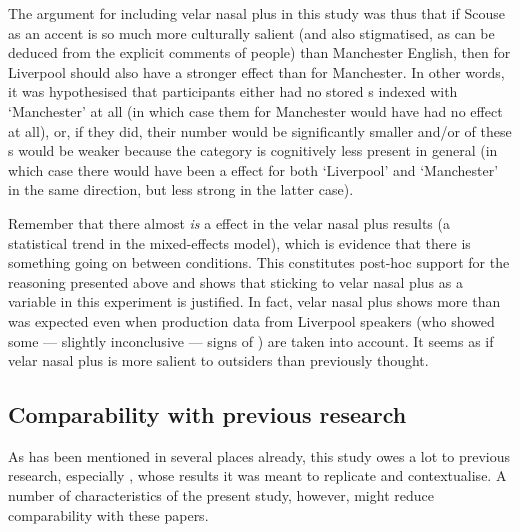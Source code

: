 The argument for including velar nasal plus in this study was thus that if Scouse as an accent is so much more culturally salient (and also stigmatised, as can be deduced from the explicit comments of people) than Manchester English, then  for Liverpool should also have a stronger effect than  for Manchester.
In other words, it was hypothesised that participants either had no stored s indexed with `Manchester' at all (in which case  them for Manchester would have had no effect at all), or, if they did, their number would be significantly smaller and/or  of these s would be weaker because the category is cognitively less present in general (in which case there would have been a  effect for both `Liverpool' and `Manchester' in the same direction, but less strong in the latter case).

Remember that there almost \emph{is} a  effect in the velar nasal plus results (a statistical trend in the mixed-effects model), which is evidence that there is something going on between  conditions.
This constitutes post-hoc support for the reasoning presented above and shows that sticking to velar nasal plus as a variable in this experiment is justified.
In fact, velar nasal plus shows more  than was expected even when production data from Liverpool speakers (who showed some --- slightly inconclusive --- signs of ) are taken into account.
It seems as if velar nasal plus is more salient to outsiders than previously thought.

		\subsection{Comparability with previous research}

As has been mentioned in several places already, this study owes a lot to previous research, especially \citealt{niedzielski1999,hayetal2006a,hayetal2006b,haydrager2010}, whose results it was meant to replicate and contextualise.
A number of characteristics of the present study, however, might reduce comparability with these papers.

